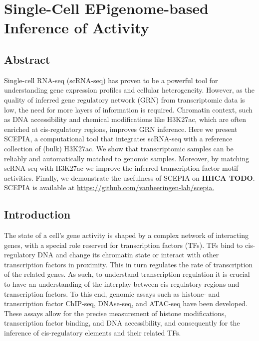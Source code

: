 \chapter{Single-Cell EPigenome-based Inference of Activity}\thumbforchapter
{}
\newpage

\section{Abstract}

Single-cell RNA-seq (scRNA-seq) has proven to be a powerful tool for understanding gene expression profiles and cellular heterogeneity. However, as the quality of inferred gene regulatory network (GRN) from transcriptomic data is low, the need for more layers of information is required. Chromatin context, such as DNA accessibility and chemical modifications like H3K27ac, which are often enriched at cis-regulatory regions, improves GRN inference. Here we present SCEPIA, a computational tool that integrates scRNA-seq with a reference collection of (bulk) H3K27ac. We show that transcriptomic samples can be reliably and automatically matched to genomic samples. Moreover, by matching scRNA-seq with H3K27ac we improve the inferred transcription factor motif activities. Finally, we demonstrate the usefulness of SCEPIA on \textbf{HHCA TODO}. SCEPIA is available at \url{https://github.com/vanheeringen-lab/scepia.}

\section{Introduction}

The state of a cell's gene activity is shaped by a complex network of interacting genes, with a special role reserved for transcription factors (TFs). TFs bind to cis-regulatory DNA and change its chromatin state or interact with other transcription factors in proximity\cite{Spitz2012}. This in turn regulates the rate of transcription of the related genes. As such, to understand transcription regulation it is crucial to have an understanding of the interplay between cis-regulatory regions and transcription factors. To this end, genomic assays such as histone- and transcription factor ChIP-seq\cite{Robertson_2007}, DNAse-seq\cite{Boyle_2008}, and ATAC-seq\cite{Buenrostro_2013} have been developed. These assays allow for the precise measurement of histone modifications, transcription factor binding, and DNA accessibility, and consequently for the inference of cis-regulatory elements and their related TFs.

